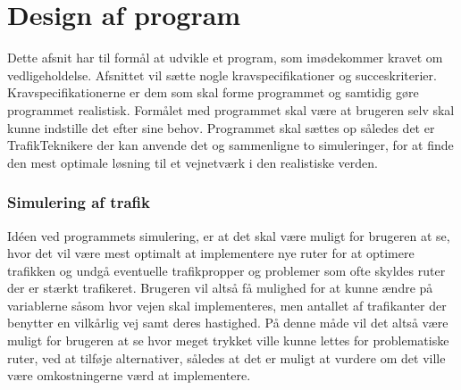 \chapter{Design af program}
Dette afsnit har til formål at udvikle et program, som imødekommer kravet om vedligeholdelse. Afsnittet vil sætte nogle kravspecifikationer og succeskriterier. Kravspecifikationerne er dem som skal forme programmet og samtidig gøre programmet realistisk. Formålet med programmet skal være at brugeren selv skal kunne indstille det efter sine behov. Programmet skal sættes op således det er TrafikTeknikere der kan anvende det og sammenligne to simuleringer, for at finde den mest optimale løsning til et vejnetværk i den realistiske verden. 


\subsection*{Simulering af trafik}
Idéen ved programmets simulering, er at det skal være muligt for brugeren at se, hvor det vil være mest optimalt at implementere nye ruter for at optimere trafikken og undgå eventuelle trafikpropper og problemer som ofte skyldes ruter der er stærkt trafikeret. Brugeren vil altså få mulighed for at kunne ændre på variablerne såsom hvor vejen skal implementeres, men antallet af trafikanter der benytter en vilkårlig vej samt deres hastighed. På denne måde vil det altså være muligt for brugeren at se hvor meget trykket ville kunne lettes for problematiske ruter, ved at tilføje alternativer, således at det er muligt at vurdere om det ville være omkostningerne værd at implementere. 

